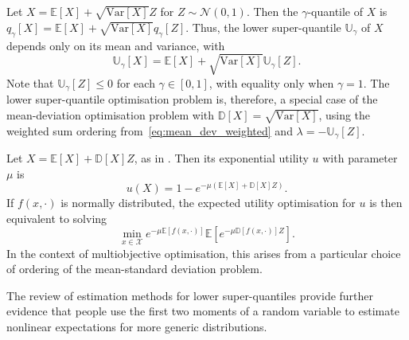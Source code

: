 \documentclass[main.tex]{subfiles}
\begin{document}
\begin{example}\label{ex:avar_normal}
  Let $X=\mathbb{E}[X]+ \sqrt{\mbox{Var}[X]} Z$ for $Z\sim\mathcal{N}(0,1)$.
  Then the $\gamma$-quantile of $X$ is
  $q_\gamma[X] = \mathbb{E}[X] + \sqrt{\mbox{Var}[X]} q_\gamma[Z]$.
  Thus, the lower super-quantile $\mathbb{U}_\gamma$ of $X$ depends only on
  its mean and variance, with
  \begin{equation}
    \mathbb{U}_\gamma[X] =  \mathbb{E}[X]
    + \sqrt{\mbox{Var}[X]} \mathbb{U}_\gamma[Z].
  \end{equation}
  Note that $\mathbb{U}_\gamma[Z]\leq 0$ for each $\gamma\in[0,1]$,
  with equality only when $\gamma=1$.
  The lower super-quantile optimisation problem is, therefore,
  a special case of the mean-deviation optimisation problem
  with $\mathbb{D}[X]=\sqrt{\mbox{Var}[X]}$,
  using the weighted sum ordering from~\eqref{eq:mean_dev_weighted} and
  $\lambda = -\mathbb{U}_\gamma[Z]$.
\end{example}

\begin{example}
  Let $X=\mathbb{E}[X]+ \mathbb{D}[X] Z$, as in .
  Then its exponential utility $u$ with parameter $\mu$
  is
  \begin{equation}
    u(X) = 1 - e^{-\mu (\mathbb{E}[X] +
      \mathbb{D}[X] Z)}.
  \end{equation}
  If $f(x,\cdot)$ is normally distributed, the expected utility
  optimisation for $u$ is then equivalent to solving
  \begin{equation}
    \min_{x\in\mathcal{X}}  e^{-\mu\mathbb{E}[f(x,\cdot)]}
    \mathbb{E} \left[ e^{-\mu \mathbb{D}[f(x,\cdot)] Z} \right].
  \end{equation}
  In the context of multiobjective optimisation, this arises from
  a particular choice of ordering of the mean-standard deviation problem.
\end{example}

The review \citep{nadarajah2014estimation} of estimation methods for
lower super-quantiles provide further evidence that people use
the first two moments of a random variable to estimate nonlinear
expectations for more generic distributions.
\end{document}
